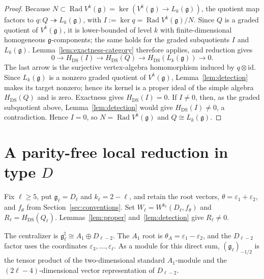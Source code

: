 \documentclass[11pt]{article}
\newcommand{\g}{\mathfrak g}
\newcommand{\Rad}{\operatorname{Rad}}
\begin{document}
\begin{proof}
Because $N\subset\Rad V^k(\g)=\ker(V^k(\g)\to L_k(\g))$, the quotient map
factors to $q:Q\twoheadrightarrow L_k(\g)$, with
$I:=\ker q=\Rad V^k(\g)/N$.  Since $Q$ is a graded quotient of
$V^k(\g)$, it is lower-bounded of level $k$ with finite-dimensional
homogeneous $\g$-components; the same holds for the graded subquotients
$I$ and $L_k(\g)$.  Lemma~\ref{lem:exactness-category} therefore applies,
and reduction gives
$$
 0\longrightarrow H_{\mathrm{DS}}(I)
 \longrightarrow H_{\mathrm{DS}}(Q)
 \longrightarrow H_{\mathrm{DS}}(L_k(\g))\longrightarrow0.
$$
The last arrow is the surjective vertex-algebra homomorphism induced by
$q\otimes\mathrm{id}$.  Since $L_k(\g)$ is a nonzero graded quotient of
$V^k(\g)$, Lemma~\ref{lem:detection} makes its target nonzero; hence its
kernel is a proper ideal of the simple algebra $H_{\mathrm{DS}}(Q)$ and is
zero.  Exactness gives $H_{\mathrm{DS}}(I)=0$.  If $I\ne0$, then, as the
graded subquotient above, Lemma~\ref{lem:detection} would give
$H_{\mathrm{DS}}(I)\ne0$, a contradiction.
  Hence $I=0$, so
$N=\Rad V^k(\g)$ and $Q\cong L_k(\g)$.
\end{proof}

\section{A parity-free local reduction in type \texorpdfstring{$D$}{D}}
\label{sec:rank}

Fix $\ell\ge5$, put $\g_\ell=D_\ell$ and $k_\ell=2-\ell$, and retain the
root vectors, $\theta=\varepsilon_1+\varepsilon_2$, and $f_\theta$ from
Section~\ref{sec:conventions}.  Set
$W_\ell=W^{k_\ell}(D_\ell,f_\theta)$ and
$R_\ell=H_{\mathrm{DS}}(Q_\ell)$.
Lemmas~\ref{lem:proper} and~\ref{lem:detection} give $R_\ell\ne0$.

The centralizer is $\g_\ell^\natural\cong A_1\oplus D_{\ell-2}$.
The $A_1$ root is $\theta_A=\varepsilon_1-\varepsilon_2$, and the
$D_{\ell-2}$ factor uses the coordinates $\varepsilon_3,\ldots,
\varepsilon_\ell$.
As a module for this direct sum, $(\g_\ell)_{-1/2}$ is the tensor product
of the two-dimensional standard $A_1$-module and the
$(2\ell-4)$-dimensional vector representation of $D_{\ell-2}$.
\end{document}
